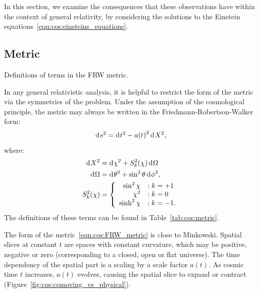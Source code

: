 In this section, we examine the consequences that these observations have within the context of general relativity, by considering the solutions to the Einstein equations~\ref{eqn:cos:einsteins_equations}.

\subsection{Metric}
\begin{table}[tp]
  \centering
  
\caption{Definitions of terms in the FRW metric.}\label{tab:cos:metric}
\end{table}

In any general relativistic analysis, it is helpful to restrict the form of the metric via the symmetries of the problem.
Under the assumption of the cosmological principle, the metric may always be written in the Friedmann-Robertson-Walker form:
\begin{equation}
  \operatorname{d}^{}\!{s}^2 = \operatorname{d}^{}\!{t}^2 - a{(t)}^2 \operatorname{d}^{}\!{X}^2,
  \label{eqn:cos:FRW_metric}
\end{equation}
where:
\begin{align}
  \operatorname{d}^{}\!{X}^2 &= \operatorname{d}^{}\!{\chi}^2 + S_k^2{(\chi)} \operatorname{d}^{}\!{\Omega}
  \label{eqn:cos:space_element}\\
  \operatorname{d}^{}\!{\Omega} &= \operatorname{d}^{}\!{\theta}^2 + \sin^2\theta \operatorname{d}^{}\!{\phi}^2,
  \label{eqn:cos:angle_element}\\
  S_k^2(\chi) &=
  \left\{
  \begin{array}{rl}
    \sin^2\chi &: k=+1 \\
    \chi^2 &: k=0 \\
    \sinh^2\chi &: k=-1. \\
  \end{array}
  \right.\label{eqn:cos:S_def}
\end{align}
The definitions of these terms can be found in Table~\ref{tab:cos:metric}. 

The form of the metric~\eqref{eqn:cos:FRW_metric} is close to Minkowski. Spatial slices at constant \(t\) are spaces with constant curvature, which may be positive, negative or zero (corresponding to a closed, open or flat universe). The time dependency of the spatial part is a scaling by a scale factor \(a(t)\). As cosmic time \(t\) increases, \(a(t)\) evolves, causing the spatial slice to expand or contract (Figure~\ref{fig:cos:comoving_vs_physical}). 



